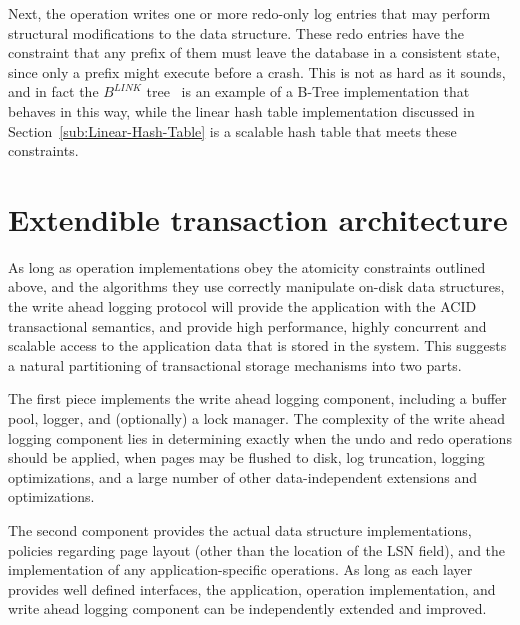 \documentclass[letterpaper,twocolumn,english]{article}
\begin{document}
Next, the operation writes one or more redo-only log entries that may perform structural
modifications to the data structure. These redo entries have the constraint that any prefix of them must leave the database in a consistent state, since only a prefix might execute before a crash.  This is not as hard as it sounds, and in fact the
$B^{LINK}$ tree~\cite{blink} is an example of a B-Tree implementation
that behaves in this way, while the linear hash table implementation
discussed in Section~\ref{sub:Linear-Hash-Table} is a scalable 
hash table that meets these constraints.


\section{Extendible transaction architecture}

As long as operation implementations obey the atomicity constraints
outlined above, and the algorithms they use correctly manipulate
on-disk data structures, the write ahead logging protocol will provide
the application with the ACID transactional semantics, and provide
high performance, highly concurrent and scalable access to the
application data that is stored in the system.  This suggests a
natural partitioning of transactional storage mechanisms into two
parts.

The first piece implements the write ahead logging component,
including a buffer pool, logger, and (optionally) a lock manager.  
The complexity of the write ahead logging component lies in
determining exactly when the undo and redo operations should be
applied, when pages may be flushed to disk, log truncation, logging
optimizations, and a large number of other data-independent extensions
and optimizations.

The second component provides the actual data structure
implementations, policies regarding page layout (other than the
location of the LSN field), and the implementation of any application-specific operations.
As long as each layer provides well defined interfaces, the application, 
operation implementation, and write ahead logging component can be 
independently extended and improved.
\end{document}
